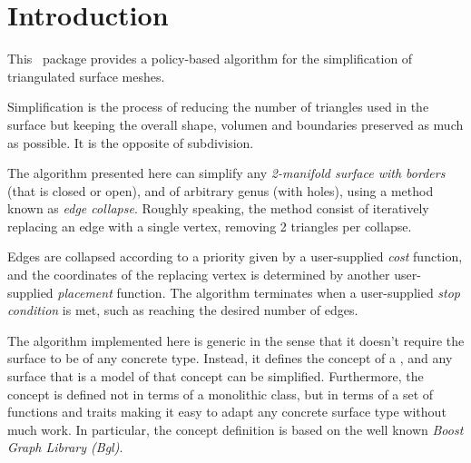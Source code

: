 
\section{Introduction}

This \cgal\ package provides a policy-based algorithm for the simplification of triangulated surface meshes.

Simplification is the process of reducing the number of triangles used in the surface but keeping the overall shape, volumen and boundaries preserved as much as possible. It is the opposite of subdivision.


The algorithm presented here can simplify any {\em 2-manifold surface with borders} (that is closed or open), and of arbitrary genus (with holes), using a method known as {\em edge collapse}. Roughly speaking, the method consist of iteratively replacing an edge with a single vertex, removing 2 triangles per collapse.


Edges are collapsed according to a priority given by a user-supplied {\em cost} function, and the coordinates of the replacing vertex is determined by another user-supplied {\em placement} function. The algorithm terminates when a user-supplied {\em stop condition} is met, such as reaching the desired number of edges.

The algorithm implemented here is generic in the sense that it doesn't require the surface to be of any concrete type. Instead, it defines the concept of a , and any surface that is a model of that concept can be simplified. Furthermore, the concept is defined not in terms of a monolithic class, but in terms of a set of functions and traits making it easy to adapt any concrete surface type without much work. In particular, the concept definition is based on the well known {\em Boost Graph Library ({\sc Bgl})}.

